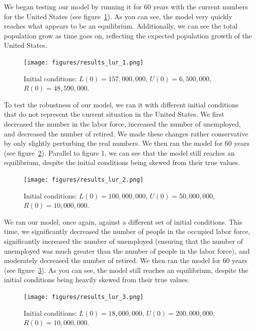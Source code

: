 \documentclass[11pt]{amsart}
\begin{document}
We began testing our model by running it for 60 years with the current numbers for the United States (see figure~\ref{fig:results_lur_1}). As you can see,
the model very quickly reaches what appears to be an equilibrium. Additionally, we can see the total population grow as time goes on, reflecting the expected population growth of the United States.

\begin{figure}[h]
    \centering
    \texttt{[image: figures/results\_lur\_1.png]}
    \caption{Initial conditions: $L(0) = 157,000,000$, $U(0) = 6,500,000$, $R(0) = 48,590,000$.}
    \label{fig:results_lur_1}
\end{figure}

To test the robustness of our model, we ran it with different initial conditions that do not represent the current situation in the United States. 
We first decreased the number in the labor force, increased the number of unemployed, and decreased the number of retired. We made these changes rather conservative
by only slightly perturbing the real numbers. We then ran the model for 60 years (see figure~\ref{fig:results_lur_2}).
Parallel to figure 1, we can see that the model still reaches an equilibrium, despite the initial conditions being skewed from their true values.

\begin{figure}[h]
    \centering
    \texttt{[image: figures/results\_lur\_2.png]}
    \caption{Initial conditions: $L(0) = 100,000,000$, $U(0) = 50,000,000$, $R(0) = 10,000,000$.}
    \label{fig:results_lur_2}
\end{figure}

We ran our model, once again, against a different set of initial conditions. This time, we significantly decreased the number of people in the occupied
labor force, significantly increased the number of unemployed (ensuring that the number of unemployed was much greater than the number of people in the labor force), and moderately decreased the number of retired. We then ran the model for 60 years (see figure~\ref{fig:results_lur_3}).
As you can see, the model still reaches an equilibrium, despite the initial conditions being heavily skewed from their true values.

\begin{figure}[h]
    \centering
    \texttt{[image: figures/results\_lur\_3.png]}
    \caption{Initial conditions: $L(0) = 18,000,000$, $U(0) = 200,000,000$, $R(0) = 10,000,000$.}
    \label{fig:results_lur_3}
\end{figure}
\end{document}

